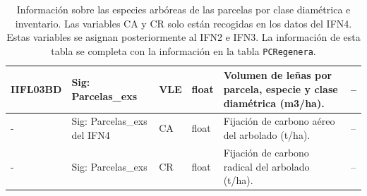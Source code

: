 \begin{table}[H]
{\begin{tabular}{|>{\centering\arraybackslash}m{1.5cm}|>{\centering\arraybackslash}m{3.5cm}|>{\centering\arraybackslash}m{3.5cm}|>{\centering\arraybackslash}m{2cm}|m{5cm}|>{\centering\arraybackslash}m{2cm}|}
\hline
IIFL03BD & Sig: Parcelas\_exs & VLE & float & Volumen de leñas por parcela, especie y clase diamétrica (m3/ha). & -- \\
\hline
- & Sig: Parcelas\_exs del IFN4 & CA & float & Fijación de carbono aéreo del arbolado (t/ha). & -- \\
\hline
- & Sig: Parcelas\_exs & CR & float & Fijación de carbono radical del arbolado (t/ha). & -- \\
\hline
\end{tabular}%
}
\caption{Información sobre las especies arbóreas de las parcelas por clase diamétrica e inventario. Las variables CA y CR solo están recogidas en los datos del IFN4. Estas variables se asignan posteriormente al IFN2 e IFN3. La información de esta tabla se completa con la información en la tabla \texttt{PCRegenera}.}
\label{tab:parcela_inventario_especie_cd}
\end{table}






